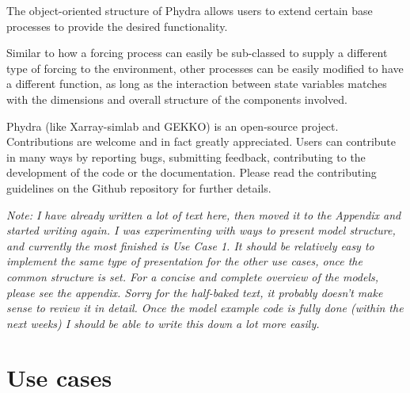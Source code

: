 \documentclass[journal abbreviations, manuscript]{copernicus}
\begin{document}
The object-oriented structure of Phydra allows users to extend certain base processes to provide the desired functionality. 

Similar to how a forcing process can easily be sub-classed to supply a different type of forcing to the environment, other processes can be easily modified to have a different function, as long as the interaction between state variables matches with the dimensions and overall structure of the components involved. 

Phydra (like Xarray-simlab and GEKKO) is an open-source project. Contributions are welcome and in fact greatly appreciated. Users can contribute in many ways by reporting bugs, submitting feedback, contributing to the development of the code or the documentation. Please read the contributing guidelines on the Github repository for further details.







\clearpage



\textit{Note: I have already written a lot of text here, then moved it to the Appendix and started writing again. I was experimenting with ways to present model structure, and currently the most finished is Use Case 1. It should be relatively easy to implement the same type of presentation for the other use cases, once the common structure is set. For a concise and complete overview of the models, please see the appendix. Sorry for the half-baked text, it probably doesn't make sense to review it in detail. Once the model example code is fully done (within the next weeks) I should be able to write this down a lot more easily.}

\section{Use cases} \label{Section:UseCases}

\end{document}
